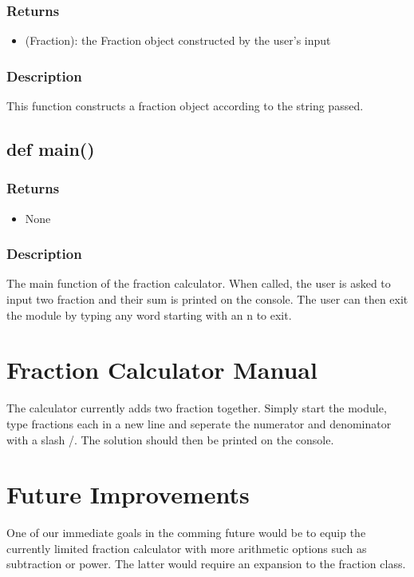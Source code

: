 \documentclass[refman]{scrartcl}
\begin{document}
\subsubsection*{Returns}

\begin{itemize}
	\item (Fraction): the Fraction object constructed by the user's input
\end{itemize}

\subsubsection*{Description}

This function constructs a fraction object according to the string passed.

\subsection{def main()}

\subsubsection*{Returns}

\begin{itemize}
	\item None
\end{itemize}

\subsubsection*{Description}

The main function of the fraction calculator. When called, the user is asked to input two fraction and their sum is printed on the console. The user can then exit the module by typing any word starting with an n to exit.

\section{Fraction Calculator Manual}

The calculator currently adds two fraction together. Simply start the module, type fractions each in a new line and seperate the numerator and denominator with a slash /. The solution should then be printed on the console.

\section{Future Improvements}

One of our immediate goals in the comming future would be to equip the currently limited fraction calculator with more arithmetic options such as subtraction or power. The latter would require an expansion to the fraction class.
\end{document}
